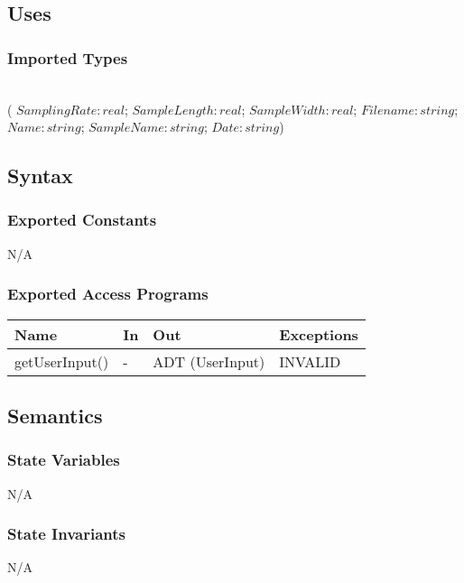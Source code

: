 \documentclass[12pt, titlepage]{article}
\begin{document}
\subsection{Uses}

\subsubsection{Imported Types}

 \\
( $SamplingRate: real$; $SampleLength: real$; $SampleWidth: real$; $Filename: string$; $Name: string$; $SampleName: string$; $Date: string$)

\subsection{Syntax}

\subsubsection{Exported Constants}
N/A

\subsubsection{Exported Access Programs}

\begin{center}
\begin{tabular}{p{4cm} p{2cm} p{6cm} p{2cm}}
\hline
\textbf{Name} & \textbf{In} & \textbf{Out} & \textbf{Exceptions} \\
\hline
getUserInput() & - & ADT (UserInput) & INVALID \\
\hline
\end{tabular}
\end{center}

\subsection{Semantics}

\subsubsection{State Variables}
N/A

\subsubsection{State Invariants}
N/A
\end{document}
